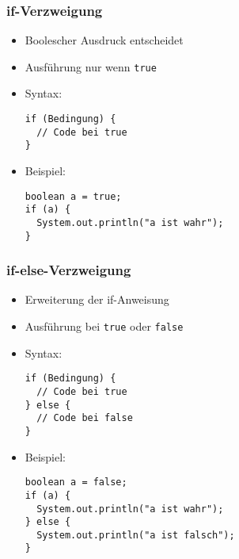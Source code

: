 \documentclass{../../presentation}
\begin{document}
\begin{frame}[fragile]
  \frametitle{if-Verzweigung}

  \begin{itemize}
    \item<1-> Boolescher Ausdruck entscheidet
    \item<1-> Ausführung nur wenn \texttt{true}
    \item<1-> Syntax:
      \begin{verbatim}
if (Bedingung) {
  // Code bei true
}
      \end{verbatim}
    \item<2-> Beispiel:
      \begin{verbatim}
boolean a = true;
if (a) {
  System.out.println("a ist wahr");
}
      \end{verbatim}
      
      
  \end{itemize}
\end{frame}



\begin{frame}[fragile]
  \frametitle{if-else-Verzweigung}

  \begin{itemize}
    \item<1-> Erweiterung der if-Anweisung
    \item<1-> Ausführung bei \texttt{true} oder \texttt{false}
    \item<1-> Syntax:
\begin{verbatim}
if (Bedingung) {
  // Code bei true
} else {
  // Code bei false
}
\end{verbatim}
    \item<2-> Beispiel:
\begin{verbatim}
boolean a = false;
if (a) {
  System.out.println("a ist wahr");
} else {
  System.out.println("a ist falsch");
}
\end{verbatim}
  \end{itemize}
\end{frame}
\end{document}
